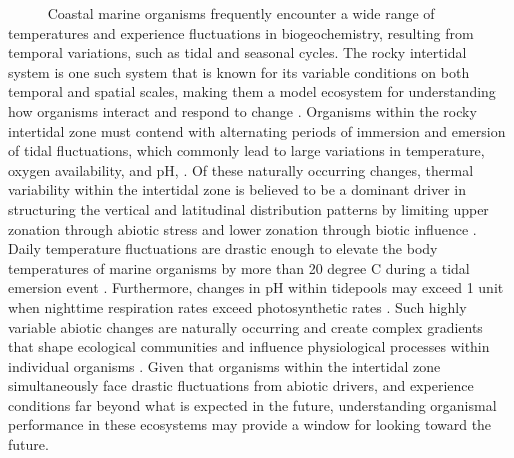 \documentclass[
]{article}
\begin{document}
~~~~~ Coastal marine organisms frequently encounter a wide range of
temperatures and experience fluctuations in biogeochemistry, resulting
from temporal variations, such as tidal and seasonal cycles. The rocky
intertidal system is one such system that is known for its variable
conditions on both temporal and spatial scales, making them a model
ecosystem for understanding how organisms interact and respond to change
\citep{connell1961influence, paine1969pisaster, kwiatkowski2016nighttime, jellison2022low}.
Organisms within the rocky intertidal zone must contend with alternating
periods of immersion and emersion of tidal fluctuations, which commonly
lead to large variations in temperature, oxygen availability, and pH,
\citep{denny2001physical, helmuth2002climate}. Of these naturally
occurring changes, thermal variability within the intertidal zone is
believed to be a dominant driver in structuring the vertical and
latitudinal distribution patterns by limiting upper zonation through
abiotic stress and lower zonation through biotic influence
\citep{helmuth2006mosaic, somero2002thermal, somero2010physiology, connell1961influence}.
Daily temperature fluctuations are drastic enough to elevate the body
temperatures of marine organisms by more than 20 degree C during a tidal
emersion event \citep{Helmuth1999}. Furthermore, changes in pH within
tidepools may exceed 1 unit when nighttime respiration rates exceed
photosynthetic rates
\citep{jellison2016ocean, kwiatkowski2016nighttime}. Such highly
variable abiotic changes are naturally occurring and create complex
gradients that shape ecological communities and influence physiological
processes within individual organisms \citep{helmuth2006mosaic}. Given
that organisms within the intertidal zone simultaneously face drastic
fluctuations from abiotic drivers, and experience conditions far beyond
what is expected in the future, understanding organismal performance in
these ecosystems may provide a window for looking toward the future.
\end{document}
